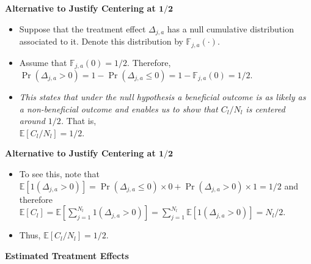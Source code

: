 \documentclass[static]{JJH-Beamer}
\begin{document}
\clearpage

\begin{center}
\textbf{Alternative to Justify Centering at $\bm{1/2}$}
\end{center}

\begin{itemize}
\item Suppose that the treatment effect $\Delta_{j,a}$ has a null cumulative distribution associated to it. Denote this distribution by $\mathbb{F}_{j,a} \left( \cdot \right)$.
\item Assume that $\mathbb{F}_{j,a} \left( 0 \right) = 1/2$. Therefore, $\Pr \left( \Delta_{j,a} > 0 \right) = 1 - \Pr \left( \Delta_{j,a} \leq 0 \right) = 1 - \mathbb{F}_{j,a} \left( 0 \right) = 1/2$.
\item \emph{This states that under the null hypothesis a beneficial outcome is as likely as a non-beneficial outcome and enables us to show that $C_{l}/N_{l}$ is centered around $1/2$.} That is, \\$\mathbb{E} \left[ C_{l}/N_{l} \right] = 1/2$.
\end{itemize}

\begin{center}
\textbf{Alternative to Justify Centering at $\bm{1/2}$}
\end{center}

\begin{itemize}
\item To see this, note that $\mathbb{E}\left[ 1 ( \Delta_{j,a} >0)  \right] = \Pr \left( \Delta_{j,a} \leq 0 \right) \times 0  + \Pr \left( \Delta_{j,a} > 0 \right)  \times 1 = 1/2$ and therefore \\ $\mathbb{E} \left[ C_{l}  \right] = \mathbb{E} \left[ \sum^{N_l}_{j=1} 1 (\Delta_{j,a} >0) \right] = \sum^{N_l}_{j=1} \mathbb{E}\left[ 1 ( \Delta_{j,a} >0)  \right] = N_{l}/2$.
\item Thus, $\mathbb{E} \left[ C_{l}/N_{l} \right] = 1/2$.
\end{itemize}

\begin{frame}

\begin{block}{}
\begin{center}
\textbf{Estimated Treatment Effects}
\end{center}
\end{block}

\end{frame}
\end{document}
